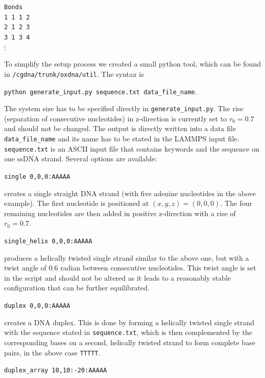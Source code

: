 \documentclass[12pt,onecolumn]{article}
\begin{document}
\smallskip
\texttt{Bonds\\
\vspace*{0.3cm}
1       1       1       2\\
2       1       2       3\\
3       1       3       4\\
$\vdots$
}
\smallskip

\noindent To simplify the setup process we created a small python tool, which can be found
in \newline \texttt{/cgdna/trunk/oxdna/util}. The syntax is

\smallskip
\texttt{python generate\_input.py sequence.txt data\_file\_name}. 
\smallskip

\noindent The system size has to be specified directly in \texttt{generate\_input.py}. 
The rise (separation of consecutive nucleotides) in z-direction is currently set to 
$r_0=0.7$ and should not be changed.
The output is directly written into a data file \texttt{data\_file\_name} and its name has to be stated in 
the LAMMPS input file. \texttt{sequence.txt} is an ASCII input file that contains 
keywords and the sequence on one ssDNA strand. Several options are available:

\smallskip
\texttt{single 0,0,0:AAAAA} 
\smallskip

\noindent creates a single straight DNA strand (with five adenine nucleotides in the above example). 
The first nucleotide is
positioned at $(x,y,z)=(0,0,0)$. The four remaining nucleotides are then added in positive
z-direction with a rise of $r_0=0.7$. 

\smallskip
\texttt{single\_helix 0,0,0:AAAAA}
\smallskip

\noindent produces a helically twisted single strand similar to the above one, but with a twist angle of $0.6$
radian between consecutive nucleotides. This twist angle is set in the script and should not be altered as it leads to a reasonably 
stable configuration that can be further equilibrated.

\smallskip
 \texttt{duplex 0,0,0:AAAAA}
\smallskip

\noindent creates a DNA duplex. This is done by forming a helically twisted single strand with the sequence stated
in \texttt{sequence.txt}, which is then complemented by the corresponding bases on a second, helically twisted 
strand to form complete base pairs, in the above case \texttt{TTTTT}.
 
\smallskip
\texttt{duplex\_array 10,10:-20:AAAAA}
\smallskip
\end{document}
